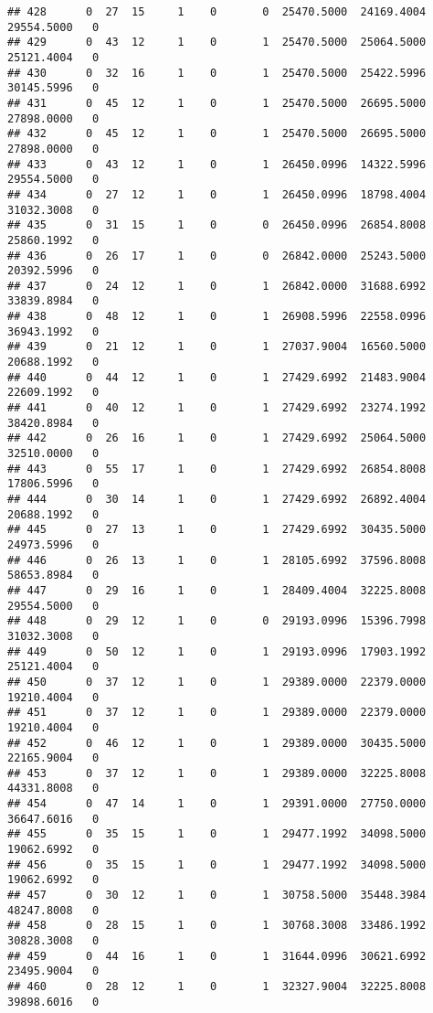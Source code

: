 \documentclass[
]{article}
\begin{document}
\begin{enumerate}
\begin{verbatim}
## 428      0  27  15     1    0       0  25470.5000  24169.4004  29554.5000   0
## 429      0  43  12     1    0       1  25470.5000  25064.5000  25121.4004   0
## 430      0  32  16     1    0       1  25470.5000  25422.5996  30145.5996   0
## 431      0  45  12     1    0       1  25470.5000  26695.5000  27898.0000   0
## 432      0  45  12     1    0       1  25470.5000  26695.5000  27898.0000   0
## 433      0  43  12     1    0       1  26450.0996  14322.5996  29554.5000   0
## 434      0  27  12     1    0       1  26450.0996  18798.4004  31032.3008   0
## 435      0  31  15     1    0       0  26450.0996  26854.8008  25860.1992   0
## 436      0  26  17     1    0       0  26842.0000  25243.5000  20392.5996   0
## 437      0  24  12     1    0       1  26842.0000  31688.6992  33839.8984   0
## 438      0  48  12     1    0       1  26908.5996  22558.0996  36943.1992   0
## 439      0  21  12     1    0       1  27037.9004  16560.5000  20688.1992   0
## 440      0  44  12     1    0       1  27429.6992  21483.9004  22609.1992   0
## 441      0  40  12     1    0       1  27429.6992  23274.1992  38420.8984   0
## 442      0  26  16     1    0       1  27429.6992  25064.5000  32510.0000   0
## 443      0  55  17     1    0       1  27429.6992  26854.8008  17806.5996   0
## 444      0  30  14     1    0       1  27429.6992  26892.4004  20688.1992   0
## 445      0  27  13     1    0       1  27429.6992  30435.5000  24973.5996   0
## 446      0  26  13     1    0       1  28105.6992  37596.8008  58653.8984   0
## 447      0  29  16     1    0       1  28409.4004  32225.8008  29554.5000   0
## 448      0  29  12     1    0       0  29193.0996  15396.7998  31032.3008   0
## 449      0  50  12     1    0       1  29193.0996  17903.1992  25121.4004   0
## 450      0  37  12     1    0       1  29389.0000  22379.0000  19210.4004   0
## 451      0  37  12     1    0       1  29389.0000  22379.0000  19210.4004   0
## 452      0  46  12     1    0       1  29389.0000  30435.5000  22165.9004   0
## 453      0  37  12     1    0       1  29389.0000  32225.8008  44331.8008   0
## 454      0  47  14     1    0       1  29391.0000  27750.0000  36647.6016   0
## 455      0  35  15     1    0       1  29477.1992  34098.5000  19062.6992   0
## 456      0  35  15     1    0       1  29477.1992  34098.5000  19062.6992   0
## 457      0  30  12     1    0       1  30758.5000  35448.3984  48247.8008   0
## 458      0  28  15     1    0       1  30768.3008  33486.1992  30828.3008   0
## 459      0  44  16     1    0       1  31644.0996  30621.6992  23495.9004   0
## 460      0  28  12     1    0       1  32327.9004  32225.8008  39898.6016   0

\end{verbatim}
\end{enumerate}
\end{document}
